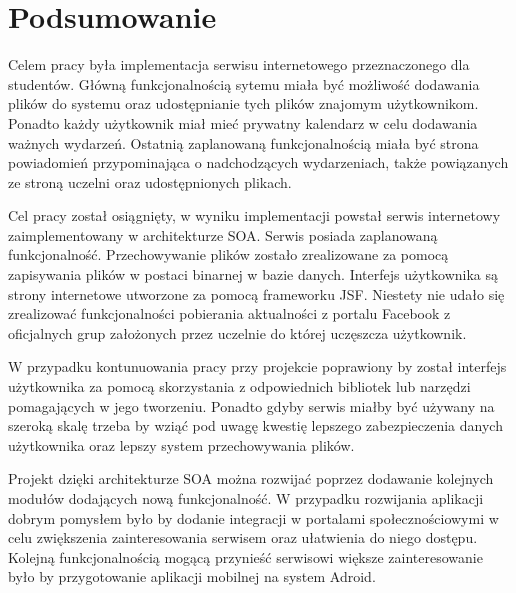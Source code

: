 \chapter{Podsumowanie}
\label{cha:podsumowanie}

Celem pracy była implementacja serwisu internetowego przeznaczonego dla studentów. Główną funkcjonalnością sytemu miała być możliwość dodawania plików do systemu oraz udostępnianie tych plików znajomym użytkownikom. Ponadto każdy użytkownik miał mieć prywatny kalendarz w celu dodawania ważnych wydarzeń. Ostatnią zaplanowaną funkcjonalnością miała być strona powiadomień przypominająca o nadchodzących wydarzeniach, także powiązanych ze stroną uczelni oraz udostępnionych plikach. 

Cel pracy został osiągnięty, w wyniku implementacji powstał serwis internetowy zaimplementowany w architekturze SOA. Serwis posiada zaplanowaną funkcjonalność. Przechowywanie plików zostało zrealizowane za pomocą zapisywania plików w postaci binarnej w bazie danych. Interfejs użytkownika są strony internetowe utworzone za pomocą frameworku JSF. Niestety nie udało się zrealizować funkcjonalności pobierania aktualności z portalu Facebook z oficjalnych grup założonych przez uczelnie do której uczęszcza użytkownik.

W przypadku kontunuowania pracy przy projekcie poprawiony by został interfejs użytkownika za pomocą skorzystania z odpowiednich bibliotek lub narzędzi pomagających w jego tworzeniu. Ponadto gdyby serwis miałby być używany na szeroką skalę trzeba by wziąć pod uwagę kwestię lepszego zabezpieczenia danych użytkownika oraz lepszy system przechowywania plików.

Projekt dzięki architekturze SOA można rozwijać poprzez dodawanie kolejnych modułów dodających nową funkcjonalność. W przypadku rozwijania aplikacji dobrym pomysłem było by dodanie integracji w portalami społecznościowymi w celu zwiększenia zainteresowania serwisem oraz ułatwienia do niego dostępu. Kolejną funkcjonalnością mogącą przynieść serwisowi większe zainteresowanie było by przygotowanie aplikacji mobilnej na system Adroid.